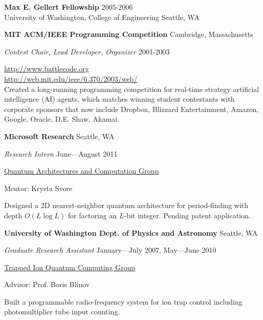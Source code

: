 \documentclass[letter]{article}
\begin{document}
\vspace{\baselineskip}
\par
{\bf {Max E. Gellert Fellowship}} \hfill 2005-2006\\
University of Washington, College of Engineering \hfill Seattle, WA

\par

\vspace{\baselineskip}

{\bf MIT ACM/IEEE Programming Competition} \hfill Cambridge, Massachusetts

{\em Contest Chair, Lead Developer, Organizer} \hfill 2001-2003
\vspace{0.5\baselineskip}
\par

\url{http://www.battlecode.org}\\
\url{http://web.mit.edu/ieee/6.370/2003/web/}\\
Created a long-running
programming competition for real-time strategy artificial intelligence
(AI) agents, which matches winning student contestants with corporate
sponsors that now include
Dropbox, Blizzard Entertainment, Amazon, Google, Oracle, D.E. Shaw, Akamai.

\pagebreak

\vspace{\baselineskip}
\par
{\bf {Microsoft Research}} \hfill Seattle, WA
\par
{\em Research Intern} \hfill June---August 2011
\par
\href{http://research.microsoft.com/en-us/groups/quarc/default.aspx}{Quantum Architectures and Computation Group}
\par
Mentor: Krysta Svore
\par
Designed a 2D nearest-neighbor quantum architecture for period-finding with
depth $O(L \log L)$ for factoring an $L$-bit integer. Pending patent
application.

\vspace{\baselineskip}
\par
{\bf {University of Washington Dept. of Physics and Astronomy}} \hfill Seattle, WA
\par
{\em Graduate Research Assistant} \hfill January---July 2007, May---June 2010
\par
\href{http://depts.washington.edu/qcomp/}{Trapped Ion Quantum Computing Group}
\par
Advisor: Prof. Boris Blinov
\par
Built a programmable radio-frequency system for ion trap control including
photomultiplier tube input counting.
\end{document}

